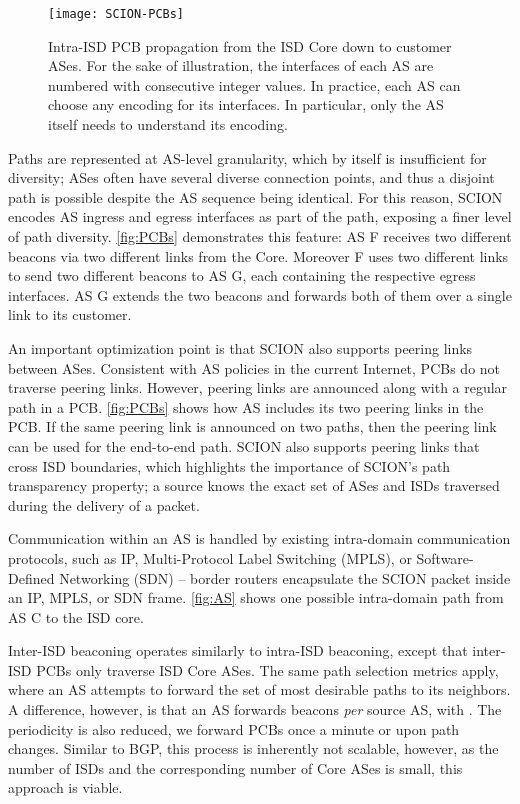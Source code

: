 \documentclass[a4paper]{llncs}
\newcommand\SCION{{\small\textsf{SCION}}\xspace}
\newcommand\C{\textsf{C}\xspace}
\newcommand\F{\textsf{F}\xspace}
\newcommand\G{\textsf{G}\xspace}
\begin{document}
\begin{figure}[h]
  \centering
  \texttt{[image: SCION-PCBs]}
  \caption{Intra-ISD PCB propagation from the ISD Core down to customer ASes.
  For the sake of illustration, the interfaces of each AS are
  numbered with consecutive integer values. In practice, each AS can choose
  any encoding for its interfaces. In particular, only the
  AS itself needs to understand its encoding.}     \label{fig:PCBs}
\end{figure}


Paths are represented at AS-level granularity, which by itself is
insufficient for diversity; ASes often have several diverse
connection points, and thus a disjoint path is possible despite the
AS sequence being identical. For this reason, \SCION encodes AS
ingress and egress interfaces as part of the path, exposing a finer
level of path diversity. \autoref{fig:PCBs} demonstrates this
feature: AS \F receives two different beacons via two different links
from the Core. Moreover \F uses two different links to send two
different beacons to AS \G, each containing the respective egress
interfaces. AS \G extends the two beacons and forwards both of them
over a single link to its customer.

An important optimization point is that \SCION also supports peering
links between ASes. Consistent with AS policies in the current Internet, PCBs do
not traverse peering links. However, peering links are announced along with a
regular path in a PCB. \autoref{fig:PCBs} shows how AS includes its two
peering links in the PCB. If the same peering link is announced on two paths, then
the peering link can be used for the end-to-end path. \SCION also supports
peering links that cross ISD boundaries, which highlights the importance of
\SCION{}'s path transparency property; a source knows the exact set of ASes and
ISDs traversed during the delivery of a packet.

Communication within an AS is handled by existing intra-domain communication
protocols, such as IP, Multi-Protocol Label Switching (MPLS), or Software-Defined
Networking (SDN) -- border routers encapsulate the \SCION packet inside an IP,
MPLS, or SDN frame.  \autoref{fig:AS} shows one possible intra-domain path from
AS \C to the ISD core.

Inter-ISD beaconing operates similarly to intra-ISD beaconing, except that
inter-ISD PCBs only traverse ISD Core ASes. The same path selection metrics
apply, where an AS attempts to forward the set of most desirable paths to its
neighbors. A difference, however, is that an AS forwards  beacons
\textit{per} source AS, with . The periodicity is also reduced, we forward
PCBs once a minute or upon path changes. Similar to BGP, this process is
inherently not scalable, however, as the number of ISDs and the corresponding
number of Core ASes is small, this approach is viable.
\end{document}
